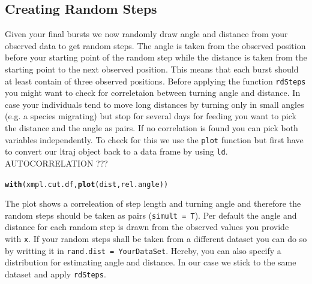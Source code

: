 \documentclass[11pt, a4paper]{article}\usepackage[]{graphicx}\usepackage[]{color}
\makeatletter
\newcommand{\hlstd}[1]{\textcolor[rgb]{0.345,0.345,0.345}{#1}}%
\newcommand{\hlkwd}[1]{\textcolor[rgb]{0.737,0.353,0.396}{\textbf{#1}}}%
\newenvironment{kframe}{%
 \def\at@end@of@kframe{}%
 \ifinner\ifhmode%
  \def\at@end@of@kframe{\end{minipage}}%
  \begin{minipage}{\columnwidth}%
 \fi\fi%
 \def\FrameCommand##1{\hskip\@totalleftmargin \hskip-\fboxsep
 \colorbox{shadecolor}{##1}\hskip-\fboxsep
     \hskip-\linewidth \hskip-\@totalleftmargin \hskip\columnwidth}%
 \MakeFramed {\advance\hsize-\width
   \@totalleftmargin\z@ \linewidth\hsize
   \@setminipage}}%
 {\par\unskip\endMakeFramed%
 \at@end@of@kframe}
\newenvironment{knitrout}{}{} %
\makeatother
\begin{document}
\subsection{Creating Random Steps}

Given your final bursts we now randomly draw angle and distance from your observed data to get random steps. The angle is taken from the observed position before your starting point of the random step while the distance is taken from the starting point to the next observed position. This means that each burst should at least contain of three observed positions. 
Before applying the function \texttt{rdSteps} you might want to check for correletaion between turning angle and distance. In case your individuals tend to move long distances by turning only in small angles (e.g. a species migrating) but stop for several days for feeding you want to pick the distance and the angle as pairs. If no correlation is found you can pick both variables independently.
To check for this we use the \texttt{plot} function but first have to convert our ltraj object back to a data frame by using \texttt{ld}.
AUTOCORRELATION ???

\begin{knitrout}
\color{fgcolor}\begin{kframe}


{\ttfamily\noindent\bfseries{}}\end{kframe}
\end{knitrout}

\begin{knitrout}
\color{fgcolor}\begin{kframe}
\begin{alltt}
\hlkwd{with}\hlstd{(xmpl.cut.df,} \hlkwd{plot}\hlstd{(dist, rel.angle))}
\end{alltt}


{\ttfamily\noindent\bfseries\color{errorcolor}{\#\# Error in with(xmpl.cut.df, plot(dist, rel.angle)): object 'xmpl.cut.df' not found}}\end{kframe}
\end{knitrout}

\noindent The plot shows a correleation of step length and turning angle and therefore the random steps should be taken as pairs (\texttt{simult = T}). Per default the angle and distance for each random step is drawn from the observed values you provide with \texttt{x}. If your random steps shall be taken from a different dataset you can do so by writting it in \texttt{rand.dist = YourDataSet}. Hereby, you can also specify a distribution for estimating angle and distance. In our case we stick to the same dataset and apply  \texttt{rdSteps}.  
\end{document}
